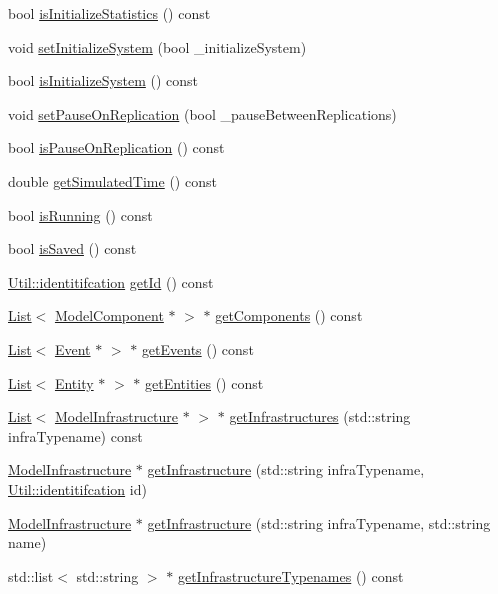 \begin{DoxyCompactItemize}
bool \hyperlink{class_model_aefe1365d9a032fe1ac62991f45446d6a}{is\-Initialize\-Statistics} () const 
\item 
void \hyperlink{class_model_ac1299b28921f4d246319b2624e4ad98f}{set\-Initialize\-System} (bool \-\_\-initialize\-System)
\item 
bool \hyperlink{class_model_afd5e0285a55278e266045112ef795868}{is\-Initialize\-System} () const 
\item 
void \hyperlink{class_model_ae1f205bd8b328b3785694567eaeb77ef}{set\-Pause\-On\-Replication} (bool \-\_\-pause\-Between\-Replications)
\item 
bool \hyperlink{class_model_a269e5b3c45f3c7ce606205fec8f0b3b4}{is\-Pause\-On\-Replication} () const 
\item 
double \hyperlink{class_model_a74eb096b8229aa036d11adeeb8787599}{get\-Simulated\-Time} () const 
\item 
bool \hyperlink{class_model_a597bdaa89e9b6b396bded780e6d32fdf}{is\-Running} () const 
\item 
bool \hyperlink{class_model_a8d47ce2750e22e14e5249b724cdf4fd3}{is\-Saved} () const 
\item 
\hyperlink{class_util_ad17d458d9344b10bba64347e514d6d71}{Util\-::identitifcation} \hyperlink{class_model_abfd7753d30de6abea64b3f0846e097eb}{get\-Id} () const 
\item 
\hyperlink{class_list}{List}$<$ \hyperlink{class_model_component}{Model\-Component} $\ast$ $>$ $\ast$ \hyperlink{class_model_ae5773d78fc47cb35be7fbeb74b7d63e4}{get\-Components} () const 
\item 
\hyperlink{class_list}{List}$<$ \hyperlink{class_event}{Event} $\ast$ $>$ $\ast$ \hyperlink{class_model_a841c78bda0eb27c652c6921094dc5921}{get\-Events} () const 
\item 
\hyperlink{class_list}{List}$<$ \hyperlink{class_entity}{Entity} $\ast$ $>$ $\ast$ \hyperlink{class_model_ae09e777b481981772818ea3fd2880c4c}{get\-Entities} () const 
\item 
\hyperlink{class_list}{List}$<$ \hyperlink{class_model_infrastructure}{Model\-Infrastructure} $\ast$ $>$ $\ast$ \hyperlink{class_model_a43ca6ff93bd0b9fbc4c2792962e6b4ed}{get\-Infrastructures} (std\-::string infra\-Typename) const 
\item 
\hyperlink{class_model_infrastructure}{Model\-Infrastructure} $\ast$ \hyperlink{class_model_ab460d8d215b5e4fb353f129c04493fa5}{get\-Infrastructure} (std\-::string infra\-Typename, \hyperlink{class_util_ad17d458d9344b10bba64347e514d6d71}{Util\-::identitifcation} id)
\item 
\hyperlink{class_model_infrastructure}{Model\-Infrastructure} $\ast$ \hyperlink{class_model_ad6711b51ea9feeacb59eaf70cc8faaed}{get\-Infrastructure} (std\-::string infra\-Typename, std\-::string name)
\item 
std\-::list$<$ std\-::string $>$ $\ast$ \hyperlink{class_model_ac1a47354f008dc27fcb7fc902bb8d664}{get\-Infrastructure\-Typenames} () const 
\end{DoxyCompactItemize}


